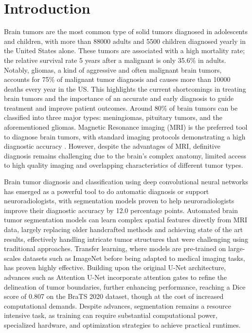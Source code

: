 \documentclass[conference]{IEEEtran}
\begin{document}
\section{Introduction}
Brain tumors are the most common type of solid tumors diagnosed in adolescents and children, with more than 88000 adults and 5500 children diagnosed yearly in the United States alone. These tumors are associated with a high mortality rate; the relative survival rate 5 years after a malignant is only 35.6\% in adults. Notably, gliomas, a kind of aggressive and often malignant brain tumors, accounts for 75\% of malignant tumor diagnosis and causes more than 10000 deaths every year in the US\cite{Dor2025Are}\cite{Khalighi2024}. This highlights the current shortcomings in treating brain tumors and the importance of an accurate and early diagnosis to guide treatment and improve patient outcomes. Around 80\% of brain tumors can be classified into three major types: meningiomas, pituitary tumors, and the aforementioned gliomas\cite{Qui2021CBT}. Magnetic Resonance imaging (MRI) is the preferred tool to diagnose brain tumors\cite{Ben2015Con}, with standard imaging protocols demonstrating a high diagnostic accuracy \cite{YAN2016109}. However, despite the advantages of MRI, definitive diagnosis remains challenging due to the brain's complex anatomy, limited access to high quality imaging and overlapping characteristics of different tumor types\cite{Khalighi2024}\cite{Gorenshtein2025}.


Brain tumor diagnosis and classification using deep convolutional neural networks has emerged as a powerful tool to do automatic diagnosis or support neuroradiologists, with segmentation models proven to help neuroradiologists improve their diagnostic accuracy by 12.0 percentage points\cite{Gao2022}. Automated brain tumor segmentation models can learn complex spatial features directly from MRI data, largely replacing older handcrafted methods and achieving state of the art results, effectively handling intricate tumor structures that were challenging using traditional approaches\cite{In2016}. Transfer learning, where models are pre-trained on large-scales datasets such as ImageNet before being adapted to medical imaging tasks, has proven highly effective\cite{Valverde2021}. Building upon the original U-Net architecture, advances such as Attention U-Net incorporate attention gates to refine the delineation of tumor boundaries, further enhancing performance, reaching a Dice score of 0.807 on the BraTS 2020 dataset, though at the cost of increased computational demands\cite{Aslam2025}. Despite advances, segmentation remains a resource intensive task, as training can require substantial computational power, specialized hardware, and optimization strategies to achieve practical runtimes\cite{Xiong2021}.
\end{document}
